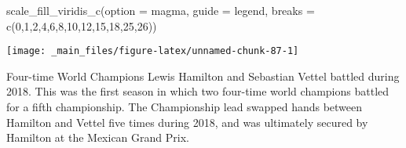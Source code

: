 \documentclass[
]{book}
\newenvironment{Shaded}{\begin{snugshade}}{\end{snugshade}}
\newcommand{\AttributeTok}[1]{\textcolor[rgb]{0.77,0.63,0.00}{#1}}
\newcommand{\DecValTok}[1]{\textcolor[rgb]{0.00,0.00,0.81}{#1}}
\newcommand{\FunctionTok}[1]{\textcolor[rgb]{0.00,0.00,0.00}{#1}}
\newcommand{\NormalTok}[1]{#1}
\newcommand{\StringTok}[1]{\textcolor[rgb]{0.31,0.60,0.02}{#1}}
\begin{document}
\begin{Shaded}
\begin{Highlighting}[]
  \FunctionTok{scale\_fill\_viridis\_c}\NormalTok{(}\AttributeTok{option =} \StringTok{\textquotesingle{}magma\textquotesingle{}}\NormalTok{,}
                       \AttributeTok{guide =} \StringTok{\textquotesingle{}legend\textquotesingle{}}\NormalTok{,}
                       \AttributeTok{breaks =} \FunctionTok{c}\NormalTok{(}\DecValTok{0}\NormalTok{,}\DecValTok{1}\NormalTok{,}\DecValTok{2}\NormalTok{,}\DecValTok{4}\NormalTok{,}\DecValTok{6}\NormalTok{,}\DecValTok{8}\NormalTok{,}\DecValTok{10}\NormalTok{,}\DecValTok{12}\NormalTok{,}\DecValTok{15}\NormalTok{,}\DecValTok{18}\NormalTok{,}\DecValTok{25}\NormalTok{,}\DecValTok{26}\NormalTok{))}
\end{Highlighting}
\end{Shaded}

\begin{center}\texttt{[image: \_main\_files/figure-latex/unnamed-chunk-87-1]} \end{center}

Four-time World Champions Lewis Hamilton and Sebastian Vettel battled during 2018. This was the first season in which two four-time world champions battled for a fifth championship. The Championship lead swapped hands between Hamilton and Vettel five times during 2018, and was ultimately secured by Hamilton at the Mexican Grand Prix.
\end{document}
